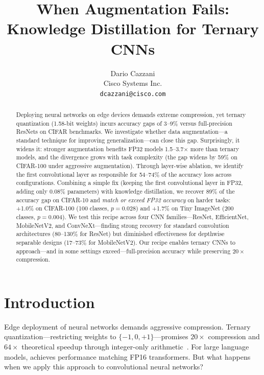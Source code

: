 \documentclass[10pt]{article}
\title{When Augmentation Fails:\\Knowledge Distillation for Ternary CNNs}
\author{
  Dario Cazzani\\
  Cisco Systems Inc.\\
  \texttt{dcazzani@cisco.com}
}
\date{}
\begin{document}
\maketitle


\begin{abstract}
Deploying neural networks on edge devices demands extreme compression, yet ternary quantization (1.58-bit weights) incurs accuracy gaps of 3--9\% versus full-precision ResNets on CIFAR benchmarks. We investigate whether data augmentation---a standard technique for improving generalization---can close this gap. Surprisingly, it widens it: stronger augmentation benefits FP32 models 1.5--3.7$\times$ more than ternary models, and the divergence grows with task complexity (the gap widens by 59\% on CIFAR-100 under aggressive augmentation). Through layer-wise ablation, we identify the first convolutional layer as responsible for 54--74\% of the accuracy loss across configurations. Combining a simple fix (keeping the first convolutional layer in FP32, adding only 0.08\% parameters) with knowledge distillation, we recover 89\% of the accuracy gap on CIFAR-10 and \emph{match or exceed FP32 accuracy} on harder tasks: +1.0\% on CIFAR-100 (100 classes, $p=0.028$) and +1.7\% on Tiny ImageNet (200 classes, $p=0.004$). We test this recipe across four CNN families---ResNet, EfficientNet, MobileNetV2, and ConvNeXt---finding strong recovery for standard convolution architectures (80--130\% for ResNet) but diminished effectiveness for depthwise separable designs (17--73\% for MobileNetV2). Our recipe enables ternary CNNs to approach---and in some settings exceed---full-precision accuracy while preserving $20\times$ compression.
\end{abstract}


\section{Introduction}
\label{sec:intro}

Edge deployment of neural networks demands aggressive compression. Ternary quantization---restricting weights to $\{-1, 0, +1\}$---promises $20\times$ compression and $64\times$ theoretical speedup through integer-only arithmetic~\cite{ma2024bitnetb158}. For large language models, \bitnetb{} achieves performance matching FP16 transformers. But what happens when we apply this approach to convolutional neural networks?
\end{document}
